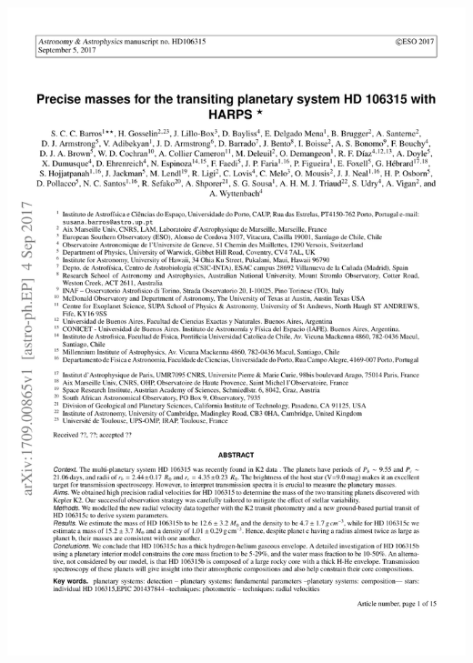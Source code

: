 {%
    {\includegraphics[width=.9\textwidth, keepaspectratio=true, page = 1, trim = 1.3cm 1cm 1.3cm 1cm, clip = true]{appendices/papers/Barros2017_grey.pdf}}


}
